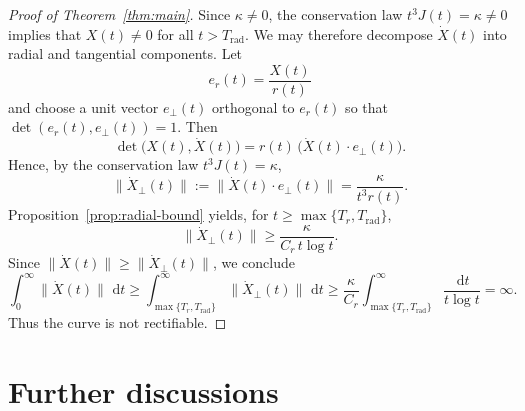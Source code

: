 \documentclass{article}
\theoremstyle{remark}
\newtheorem{remark}[theorem]{Remark}
\newcommand{\dd}{\,\mathrm{d}}
\begin{document}
\begin{proof}[Proof of Theorem~\ref{thm:main}]
Since $\kappa\neq0$, the conservation law $t^3J(t)=\kappa\ne 0$ implies that $X(t)\neq0$ for all $t>T_\mathrm{rad}$. We may therefore decompose $\dot X(t)$ into radial and tangential components. Let
\[
  e_r(t)=\frac{X(t)}{r(t)}
\]
and choose a unit vector $e_\perp(t)$ orthogonal to $e_r(t)$ so that $\det(e_r(t),e_\perp(t))=1$. Then
\[
  \det\bigl(X(t),\dot X(t)\bigr)
  =
  r(t)\,\bigl(\dot X(t)\cdot e_\perp(t)\bigr).
\]
Hence, by the conservation law $t^3J(t)=\kappa$, 
\begin{equation}
\label{eq:conservation-law}  
  \| \dot X_\perp(t)\|
  :=
  \bigl\| \dot X(t)\cdot e_\perp(t)\bigr\|
  =
  \frac{\kappa}{t^3r(t)}.
\end{equation}
Proposition~\ref{prop:radial-bound} yields, for $t\ge \max\{T_r,T_\mathrm{rad}\}$,
\[
  \| \dot X_\perp(t)\|
  \ge \frac{\kappa}{C_r\,t\log t}.
\]
Since $\|\dot X(t)\|\ge\|\dot X_\perp(t)\|$, we conclude
\[
  \int_0^\infty \| \dot X(t)\|\,\dd t
  \ge \int_{\max\{T_r,T_\mathrm{rad}\}}^\infty \| \dot X_\perp(t)\|\,\dd t
  \ge \frac{\kappa}{C_r}\int_{\max\{T_r,T_\mathrm{rad}\}}^\infty \frac{\dd t}{t\log t}
  =\infty.
\]
Thus the curve is not rectifiable.
\end{proof}










\section{Further discussions}
\end{document}
